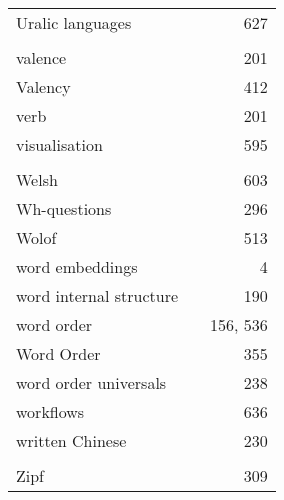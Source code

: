 \documentclass{easychair}
\begin{document}
\begin{longtable}{lp{7em}r}
Uralic languages & & 627 
\\
\\
valence & & 201 
\\
Valency & & 412 
\\
verb & & 201 
\\
visualisation & & 595 
\\
\\
Welsh & & 603 
\\
Wh-questions & & 296 
\\
Wolof & & 513 
\\
word embeddings & & 4 
\\
word internal structure & & 190 
\\
word order & & 156, 536 
\\
Word Order & & 355 
\\
word order universals & & 238 
\\
workflows & & 636 
\\
written Chinese & & 230 
\\
\\
Zipf & & 309 
\end{longtable}
\end{document}
